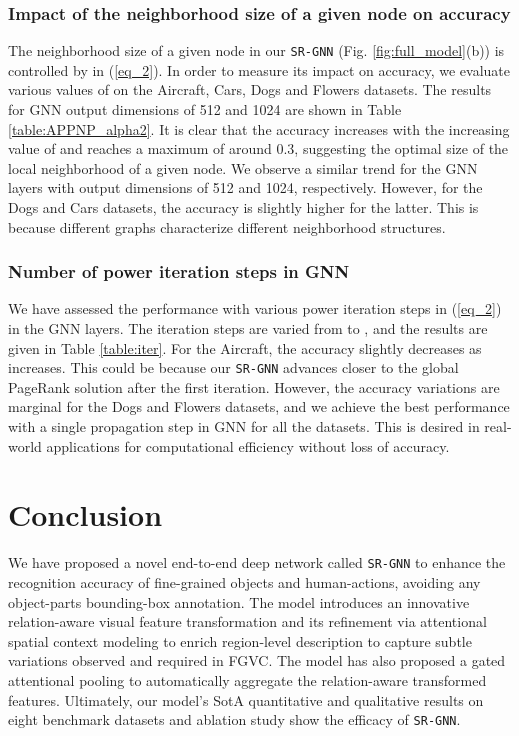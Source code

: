 \documentclass[journal]{IEEEtran}
\begin{document}
\subsubsection{Impact of the neighborhood size of a given node on accuracy}
The neighborhood size of a given node in our \texttt{SR-GNN} (Fig. \ref{fig:full_model}(b)) is controlled by  in (\ref{eq_2}). In order to measure its impact on accuracy, we evaluate various values of  on the Aircraft, Cars, Dogs and Flowers datasets. The results for GNN output dimensions of 512 and 1024 are shown in Table \ref{table:APPNP_alpha2}. It is clear that the accuracy increases with the increasing value of  and reaches a maximum of around 0.3, suggesting the optimal size of the local neighborhood of a given node.  We observe a similar trend for the GNN layers with output dimensions of 512 and 1024, respectively. However, for the Dogs and Cars datasets, the accuracy is slightly higher for the latter. This is because different graphs characterize different neighborhood structures. 

\subsubsection{Number of power iteration steps in GNN}
We have assessed the performance with  various power iteration steps  in (\ref{eq_2}) in the GNN layers. The iteration steps are varied from  to , and the results are given in Table \ref{table:iter}. For the Aircraft, the accuracy slightly decreases as  increases. This could be because our \texttt{SR-GNN} advances closer to the global PageRank solution after the first iteration. However, the accuracy variations are marginal for the Dogs and Flowers datasets, and we achieve the best performance with a single propagation step in GNN for all the datasets. This is desired in real-world applications for computational efficiency without loss of accuracy. 

\vspace{-0.2 cm}
\section{Conclusion} \label {conclusion}
We have proposed a novel end-to-end deep network called \texttt{SR-GNN} to enhance the recognition accuracy of fine-grained objects and human-actions, avoiding any object-parts bounding-box annotation. The model introduces an innovative relation-aware visual feature transformation and its refinement via attentional spatial context modeling to enrich region-level description to capture  subtle variations observed and required in FGVC. The model has also proposed a gated attentional pooling to automatically aggregate the relation-aware transformed features. Ultimately, our model’s SotA quantitative and qualitative results on eight benchmark datasets and ablation study  show the efficacy of \texttt{SR-GNN}. 
\end{document}
